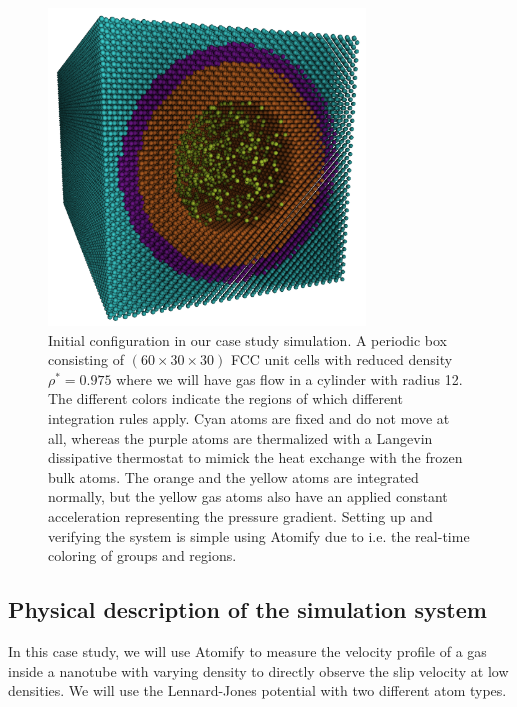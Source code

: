 \documentclass[12pt,a4paper,final]{iopart}
\begin{document}
\begin{figure}
	\centering
	\includegraphics[width=0.75\textwidth]{lj_flow/configuration.png}
	\caption{
		Initial configuration in our case study simulation.
		A periodic box consisting of $(60\times30\times30)$ FCC unit cells with reduced density $\rho^* = 0.975$ where we will have gas flow in a cylinder with radius 12.
		The different colors indicate the regions of which different integration rules apply.
		Cyan atoms are fixed and do not move at all,
		whereas the purple atoms are thermalized with a Langevin\cite{schneider1978molecular} dissipative thermostat to mimick the heat exchange with the frozen bulk atoms.
		The orange and the yellow atoms are integrated normally, but the yellow gas atoms also have an applied constant acceleration representing the pressure gradient.
		Setting up and verifying the system is simple using Atomify due to i.e. the real-time coloring of groups and regions.
	}
	\label{fig:cylinder_simulation}
\end{figure}

\subsection{Physical description of the simulation system}
In this case study, we will use Atomify to measure the velocity profile of a
gas inside a nanotube with varying density to directly observe
the slip velocity at low densities.
We will use the Lennard-Jones potential with two different atom types.
\end{document}
